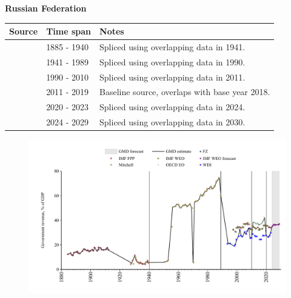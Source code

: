 \documentclass[12pt,a4paper,landscape]{article}
\begin{document}
\begin{adjustbox}{max totalsize={\paperwidth}{\paperheight},center}
\begin{minipage}[t][\textheight][t]{\textwidth}
\vspace*{0.5cm}
{}
\begin{center}
{\Large\bfseries Russian Federation}
\end{center}
\vspace{0.5cm}
\begin{table}[H]
\centering
\small
\begin{tabular}{|l|l|l|}
\hline
\textbf{Source} & \textbf{Time span} & \textbf{Notes} \\
\hline
\rowcolor{white}\cite{IMF_FPP}& 1885 - 1940 &Spliced using overlapping data in 1941.\\
\rowcolor{lightgray}\cite{Mitchell}& 1941 - 1989 &Spliced using overlapping data in 1990.\\
\rowcolor{white}\cite{WDI}& 1990 - 2010 &Spliced using overlapping data in 2011.\\
\rowcolor{lightgray}\cite{OECD_EO}& 2011 - 2019 &Baseline source, overlaps with base year 2018.\\
\rowcolor{white}\cite{WDI}& 2020 - 2023 &Spliced using overlapping data in 2024.\\
\rowcolor{lightgray}\cite{IMF_WEO_forecast}& 2024 - 2029 &Spliced using overlapping data in 2030.\\
\hline
\end{tabular}
\end{table}
\begin{figure}[H]
\centering
\includegraphics[width=\textwidth,height=0.6\textheight,keepaspectratio]{graphs/RUS_govrev_GDP.pdf}
\end{figure}
\end{minipage}
\end{adjustbox}
\end{document}
